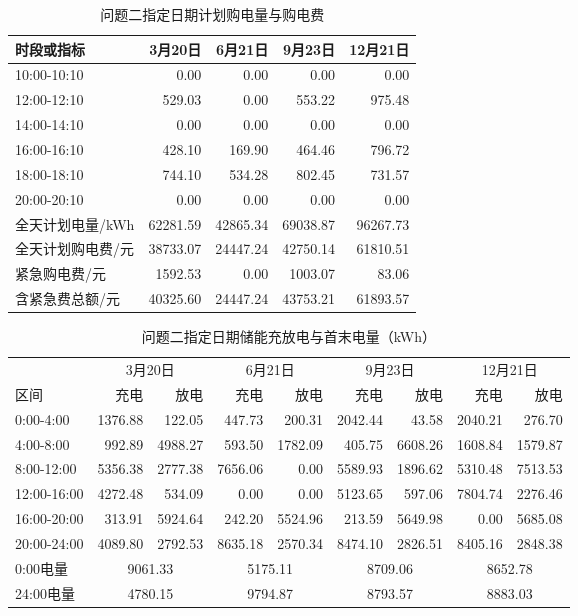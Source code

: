 \begin{table}[htbp]\centering
\caption{问题二指定日期计划购电量与购电费}\label{tab:q2buy}
\small
\begin{tabular}{lrrrr}
\toprule
时段或指标 & 3月20日 & 6月21日 & 9月23日 & 12月21日 \\
\midrule
10:00-10:10 & 0.00 & 0.00 & 0.00 & 0.00 \\
12:00-12:10 & 529.03 & 0.00 & 553.22 & 975.48 \\
14:00-14:10 & 0.00 & 0.00 & 0.00 & 0.00 \\
16:00-16:10 & 428.10 & 169.90 & 464.46 & 796.72 \\
18:00-18:10 & 744.10 & 534.28 & 802.45 & 731.57 \\
20:00-20:10 & 0.00 & 0.00 & 0.00 & 0.00 \\
全天计划电量/kWh & 62281.59 & 42865.34 & 69038.87 & 96267.73 \\
全天计划购电费/元 & 38733.07 & 24447.24 & 42750.14 & 61810.51 \\
紧急购电费/元 & 1592.53 & 0.00 & 1003.07 & 83.06 \\
含紧急费总额/元 & 40325.60 & 24447.24 & 43753.21 & 61893.57 \\
\bottomrule
\end{tabular}
\end{table}
\begin{table}[htbp]\centering
\caption{问题二指定日期储能充放电与首末电量（kWh）}\label{tab:q2soc}
\footnotesize
\setlength{\tabcolsep}{4pt}
\begin{tabular}{lrrrrrrrr}
\toprule
 & \multicolumn{2}{c}{3月20日} & \multicolumn{2}{c}{6月21日} & \multicolumn{2}{c}{9月23日} & \multicolumn{2}{c}{12月21日}\\
区间 & 充电 & 放电 & 充电 & 放电 & 充电 & 放电 & 充电 & 放电 \\
\midrule
0:00-4:00 & 1376.88 & 122.05 & 447.73 & 200.31 & 2042.44 & 43.58 & 2040.21 & 276.70 \\
4:00-8:00 & 992.89 & 4988.27 & 593.50 & 1782.09 & 405.75 & 6608.26 & 1608.84 & 1579.87 \\
8:00-12:00 & 5356.38 & 2777.38 & 7656.06 & 0.00 & 5589.93 & 1896.62 & 5310.48 & 7513.53 \\
12:00-16:00 & 4272.48 & 534.09 & 0.00 & 0.00 & 5123.65 & 597.06 & 7804.74 & 2276.46 \\
16:00-20:00 & 313.91 & 5924.64 & 242.20 & 5524.96 & 213.59 & 5649.98 & 0.00 & 5685.08 \\
20:00-24:00 & 4089.80 & 2792.53 & 8635.18 & 2570.34 & 8474.10 & 2826.51 & 8405.16 & 2848.38 \\
0:00电量 & \multicolumn{2}{c}{9061.33} & \multicolumn{2}{c}{5175.11} & \multicolumn{2}{c}{8709.06} & \multicolumn{2}{c}{8652.78} \\
24:00电量 & \multicolumn{2}{c}{4780.15} & \multicolumn{2}{c}{9794.87} & \multicolumn{2}{c}{8793.57} & \multicolumn{2}{c}{8883.03} \\
\bottomrule
\end{tabular}
\end{table}
